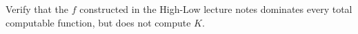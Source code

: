 \begin{problem}
  Verify that the $f$ constructed in the High-Low lecture
  notes dominates every total computable function, but does not
  compute $K$.

  \begin{answer}

  \end{answer}
\end{problem}
